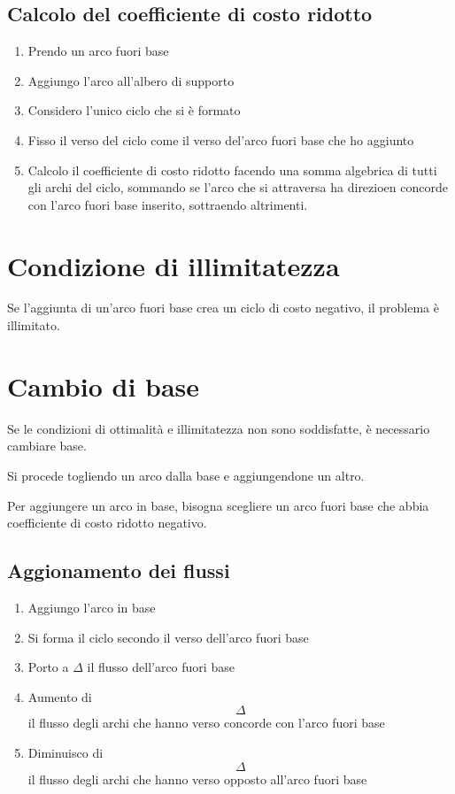 \subsection{Calcolo del coefficiente di costo ridotto}
\begin{enumerate}
  \item Prendo un arco fuori base
  \item Aggiungo l'arco all'albero di supporto
  \item Considero l'unico ciclo che si \`e formato
  \item Fisso il verso del ciclo come il verso del'arco fuori base che ho aggiunto
  \item Calcolo il coefficiente di costo ridotto facendo una somma algebrica di tutti gli archi del ciclo, sommando se l'arco che si attraversa ha direzioen concorde con l'arco fuori base inserito, sottraendo altrimenti.
\end{enumerate}


\section{Condizione di illimitatezza}
Se l'aggiunta di un'arco fuori base crea un ciclo di costo negativo, il problema \`e illimitato.


\section{Cambio di base}
Se le condizioni di ottimalit\`a e illimitatezza non sono soddisfatte, \`e necessario cambiare base.

Si procede togliendo un arco dalla base e aggiungendone un altro.

Per aggiungere un arco in base, bisogna scegliere un arco fuori base che abbia coefficiente di costo ridotto negativo.

\subsection{Aggionamento dei flussi}
\begin{enumerate}
  \item Aggiungo l'arco in base
  \item Si forma il ciclo secondo il verso dell'arco fuori base
  \item Porto a $\Delta$ il flusso dell'arco fuori base
  \item Aumento di $$\Delta$$ il flusso degli archi che hanno verso concorde con l'arco fuori base
  \item Diminuisco di $$\Delta$$ il flusso degli archi che hanno verso opposto all'arco fuori base
\end{enumerate}




